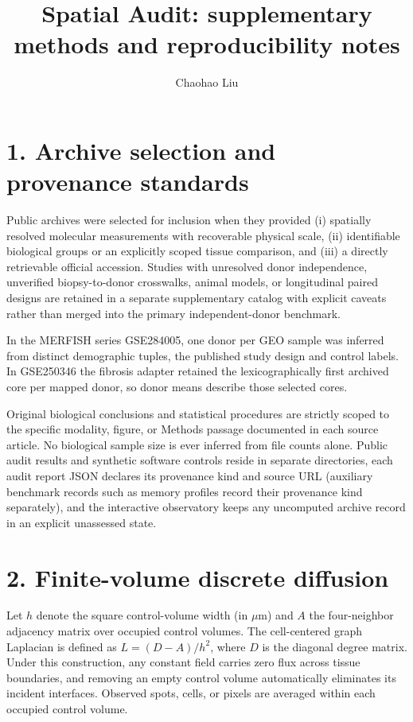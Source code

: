 \documentclass[11pt]{article}
\title{Spatial Audit: supplementary methods and reproducibility notes}
\author{Chaohao Liu}
\date{}
\begin{document}
\maketitle

\section*{1. Archive selection and provenance standards}
Public archives were selected for inclusion when they provided (i) spatially resolved molecular measurements with recoverable physical scale, (ii) identifiable biological groups or an explicitly scoped tissue comparison, and (iii) a directly retrievable official accession. Studies with unresolved donor independence, unverified biopsy-to-donor crosswalks, animal models, or longitudinal paired designs are retained in a separate supplementary catalog with explicit caveats rather than merged into the primary independent-donor benchmark.

In the MERFISH series GSE284005, one donor per GEO sample was inferred from distinct demographic tuples, the published study design and control labels. In GSE250346 the fibrosis adapter retained the lexicographically first archived core per mapped donor, so donor means describe those selected cores.

Original biological conclusions and statistical procedures are strictly scoped to the specific modality, figure, or Methods passage documented in each source article. No biological sample size is ever inferred from file counts alone. Public audit results and synthetic software controls reside in separate directories, each audit report JSON declares its provenance kind and source URL (auxiliary benchmark records such as memory profiles record their provenance kind separately), and the interactive observatory keeps any uncomputed archive record in an explicit unassessed state.

\section*{2. Finite-volume discrete diffusion}
Let $h$ denote the square control-volume width (in $\mu\mathrm{m}$) and $A$ the four-neighbor adjacency matrix over occupied control volumes. The cell-centered graph Laplacian is defined as $L = (D - A)/h^2$, where $D$ is the diagonal degree matrix. Under this construction, any constant field carries zero flux across tissue boundaries, and removing an empty control volume automatically eliminates its incident interfaces. Observed spots, cells, or pixels are averaged within each occupied control volume.
\end{document}
